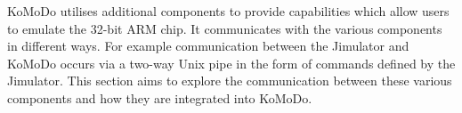 KoMoDo utilises additional components to provide capabilities which allow users to emulate the 32-bit ARM chip. It communicates with the various components in different ways. For example communication between the Jimulator and KoMoDo occurs via a two-way Unix pipe in the form of commands defined by the Jimulator. This section aims to explore the communication between these various components and how they are integrated into KoMoDo. 



